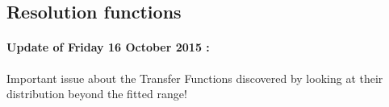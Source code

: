 %

\subsection{Resolution functions}


\paragraph{Update of Friday 16 October 2015 :} 
Important issue about the Transfer Functions discovered by looking at their distribution beyond the fitted range!
\\

